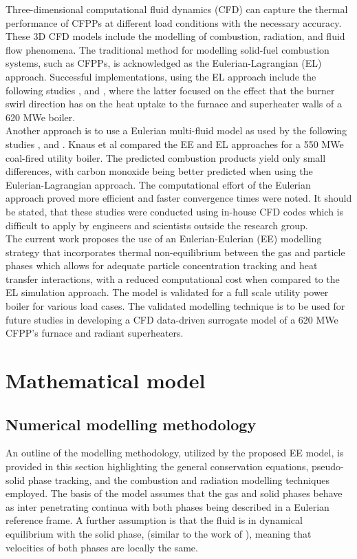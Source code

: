 \documentclass{webofc}
\begin{document}
Three-dimensional computational fluid dynamics (CFD) can capture the thermal performance of CFPPs at different load conditions with the necessary accuracy. These 3D CFD models include the modelling of combustion, radiation, and fluid flow phenomena. The traditional method for modelling
solid-fuel combustion systems, such as CFPPs, is acknowledged as the Eulerian-Lagrangian (EL) approach. Successful implementations, using the EL approach include the following studies \cite{bohnstein},\cite{laubscher_1} and \cite{laubscher_2}, where the latter focused on the effect that the burner swirl direction has on the heat uptake to the furnace and superheater walls of a 620 MWe boiler.\\

Another approach is to use a Eulerian multi-fluid model as used by the following studies \cite{epple}, \cite{cai} and \cite{wu}. Knaus et al \cite{knaus} compared the EE and EL approaches for a 550 MWe coal-fired utility boiler. The predicted combustion products yield only small differences, with carbon monoxide being better predicted when using the Eulerian-Lagrangian approach. The computational effort of the Eulerian approach proved more efficient and faster convergence times were noted. It should be stated, that these studies were conducted using in-house CFD codes which is difficult to apply by engineers and scientists outside the research group.\\

The current work proposes the use of an Eulerian-Eulerian (EE) modelling strategy that incorporates thermal non-equilibrium between the gas and particle phases which allows for adequate particle concentration tracking and heat transfer interactions, with a reduced computational cost when compared to the EL simulation approach. The model is validated for a full scale utility power boiler for various load cases. The validated modelling technique is to be used for future studies in developing a CFD data-driven surrogate model of a 620 MWe CFPP's furnace and radiant superheaters. 

\section{Mathematical model} \label{Theory}
\subsection{Numerical modelling methodology}
An outline of the modelling methodology, utilized by the proposed EE model, is provided in this section highlighting the general conservation equations, pseudo-solid phase tracking, and the combustion and radiation modelling techniques employed. The basis of the model assumes that the gas and solid phases behave as inter penetrating continua with both phases being described in a Eulerian reference frame. A further assumption is that the fluid is in dynamical equilibrium with the solid phase, (similar to the work of \cite{epple}), meaning that velocities of both phases are locally the same.
\end{document}
